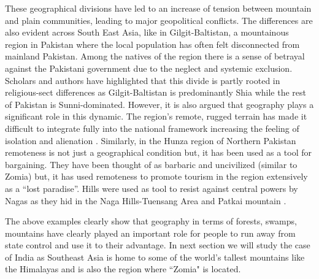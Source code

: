 \begin{sloppypar}
These geographical divisions have led to an increase of tension between mountain and plain communities,  leading to major geopolitical conflicts. The differences are also evident across South East Asia, like in Gilgit\hyp{}Baltistan, a mountainous region in Pakistan where the local population has often felt disconnected from mainland Pakistan. Among the natives of the region there is a sense of betrayal  against the Pakistani government due to the neglect and systemic exclusion. Scholars and authors have highlighted that this divide is partly rooted in religious\hyp{}sect differences as Gilgit\hyp{}Baltistan is predominantly Shia while the rest of Pakistan is  Sunni\hyp{}dominated. However, it is also argued that geography plays a significant role in this dynamic. The region's remote, rugged terrain has  made it difficult to integrate fully into the national framework  increasing the feeling of isolation and alienation \citep{ali2019delusional}. Similarly, in the Hunza region of Northern Pakistan  remoteness is not just a geographical condition but, it has been used as a tool for bargaining. They have been thought of as barbaric and uncivilized  (similar to Zomia) but, it has used remoteness to promote tourism in the region extensively as a \enquote{lost paradise}. Hills were used as tool to resist against central powers by Nagas as they hid in the Naga Hills\hyp{}Tuensang Area and Patkai mountain \citep{kapai2020spatial}.  

The above examples clearly show that geography in terms of forests, swamps, mountains have clearly played an important role for people to run away from state control and use it to their advantage.  In next section we will study the case of India as Southeast Asia is home to some of the world's tallest mountains like the Himalayas and is also the region where ``Zomia" is located.


\end{sloppypar}
